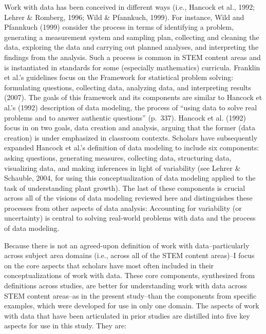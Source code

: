 \documentclass[]{msu-thesis}
\theoremstyle{definition}
\theoremstyle{definition}
\theoremstyle{definition}
\theoremstyle{remark}
\begin{document}
Work with data has been conceived in different ways (i.e., Hancock et
al., 1992; Lehrer \& Romberg, 1996; Wild \& Pfannkuch, 1999). For
instance, Wild and Pfannkuch (1999) consider the process in terms of
identifying a problem, generating a measurement system and sampling
plan, collecting and cleaning the data, exploring the data and carrying
out planned analyses, and interpreting the findings from the analysis.
Such a process is common in STEM content areas and is instantiated in
standards for some (especially mathematics) curricula. Franklin et al.'s
guidelines focus on the Framework for statistical problem solving:
formulating questions, collecting data, analyzing data, and interpreting
results (2007). The goals of this framework and its components are
similar to Hancock et al.'s (1992) description of data modeling, the
process of ``using data to solve real problems and to answer authentic
questions'' (p.~337). Hancock et al. (1992) focus in on two goals, data
creation and analysis, arguing that the former (data creation) is under
emphasized in classroom contexts. Scholars have subsequently expanded
Hancock et al.'s definition of data modeling to include six components:
asking questions, generating measures, collecting data, structuring
data, visualizing data, and making inferences in light of variability
(see Lehrer \& Schauble, 2004, for using this conceptualization of data
modeling applied to the task of understanding plant growth). The last of
these components is crucial across all of the visions of data modeling
reviewed here and distinguishes these processes from other aspects of
data analysis: Accounting for variability (or uncertainty) is central to
solving real-world problems with data and the process of data modeling.

Because there is not an agreed-upon definition of work with
data--particularly across subject area domains (i.e., across all of the
STEM content areas)--I focus on the core aspects that scholars have most
often included in their conceptualizations of work with data. These core
components, synthesized from definitions across studies, are better for
understanding work with data across STEM content areas--as in the
present study--than the components from specific examples, which were
developed for use in only one domain. The aspects of work with data that
have been articulated in prior studies are distilled into five key
aspects for use in this study. They are:
\end{document}
